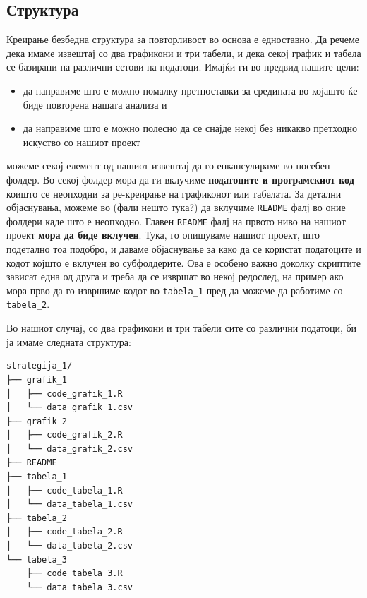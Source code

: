 \documentclass[
]{book}
\providecommand{\tightlist}{%
  \setlength{\itemsep}{0pt}\setlength{\parskip}{0pt}}
\begin{document}
\hypertarget{ux441ux442ux440ux443ux43aux442ux443ux440ux430}{%
\subsection{Структура}\label{ux441ux442ux440ux443ux43aux442ux443ux440ux430}}

Креирање безбедна структура за повторливост во основа е едноставно. Да речеме дека имаме извештај со два графикони и три табели, и дека секој график и табела се базирани на различни сетови на податоци. Имајќи ги во предвид нашите цели:

\begin{itemize}
\tightlist
\item
  да направиме што е можно помалку претпоставки за средината во којашто ќе биде повторена нашата анализа и\\
\item
  да направиме што е можно полесно да се снајде некој без никакво претходно искуство со нашиот проект
\end{itemize}

можеме секој елемент од нашиот извештај да го енкапсулираме во посебен фолдер. Во секој фолдер мора да ги вклучиме \textbf{податоците и програмскиот код} коишто се неопходни за ре-креирање на графиконот или табелата. За детални објаснувања, можеме во (фали нешто тука?) да вклучиме \texttt{README} фалј во оние фолдери каде што е неопходно. Главен \texttt{README} фалј на првото ниво на нашиот проект \textbf{мора да биде вклучен}. Тука, го опишуваме нашиот проект, што подетално тоа подобро, и даваме објаснување за како да се користат податоците и кодот којшто е вклучен во субфолдерите. Ова е особено важно доколку скриптите зависат една од друга и треба да се извршат во некој редослед, на пример ако мора прво да го извршиме кодот во \texttt{tabela\_1} пред да можеме да работиме со \texttt{tabela\_2}.

Во нашиот случај, со два графикони и три табели сите со различни податоци, би ја имаме следната структура:

\begin{verbatim}
strategija_1/
├── grafik_1
│   ├── code_grafik_1.R
│   └── data_grafik_1.csv
├── grafik_2
│   ├── code_grafik_2.R
│   └── data_grafik_2.csv
├── README
├── tabela_1
│   ├── code_tabela_1.R
│   └── data_tabela_1.csv
├── tabela_2
│   ├── code_tabela_2.R
│   └── data_tabela_2.csv
└── tabela_3
    ├── code_tabela_3.R
    └── data_tabela_3.csv
\end{verbatim}
\end{document}

